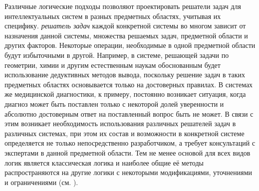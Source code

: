 Различные логические подходы позволяют проектировать решатели задач для интеллектуальных систем в разных предметных областях, учитывая их специфику. \textit{решатель задач} каждой конкретной системы во многом зависит от назначения данной системы, множества решаемых задач, предметной области и других факторов. Некоторые операции, необходимые в одной предметной области будут избыточными в другой. Например, в системе, решающей задачи по геометрии, химии и другим естественным наукам обоснованным будет использование дедуктивных методов вывода, поскольку решение задач в таких предметных областях основывается только на достоверных правилах. В системах же медицинской диагностики, к примеру, постоянно возникает ситуация, когда диагноз может быть поставлен только с некоторой долей уверенности и абсолютно достоверным ответ на поставленный вопрос быть не может. В связи с этим возникает необходимость использования различных решателей задач в различных системах, при этом их состав и возможности в конкретной системе определяется не только непосредственно разработчиком, а требует консультаций с экспертами в данной предметной области. Тем не менее основой для всех видов логик является классическая логика и наиболее общие её методы распространяются на другие логики с некоторыми модификациями, уточнениями и ограничениями (см. \textit{}).

